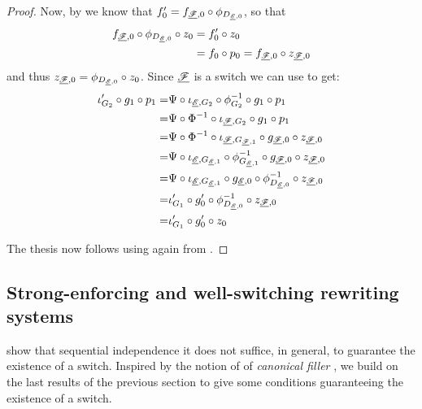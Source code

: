\begin{proof}
 	Now, by  we know that $f'_{0}=f_{\underline{\mathscr{F}},0}\circ \phi_{D_{\underline{\mathscr{E}},0}}$, so that 
 	\begin{align*}
 		f_{\underline{\mathscr{F}},0}\circ \phi_{D_{\underline{\mathscr{E}},0}}\circ z_0&=f'_{0}\circ z_0\\&=f_0\circ p_0=f_{\underline{\mathscr{F}},0}\circ z_{\underline{\mathscr{F}},0}
 	\end{align*}
 	and thus $z_{\underline{\mathscr{F}},0}=\phi_{D_{\underline{\mathscr{E}},0}}\circ z_0$. Since $\underline{\mathscr{F}}$ is a switch we can use  to get:
	\begin{align*}
		\iota'_{G_2}\circ g_1\circ p_1=&\Psi\circ \iota_{\underline{\mathscr{E}}, G_2}\circ \phi^{-1}_{G_2}\circ g_1\circ p_1\\=&\Psi\circ \Phi^{-1}\circ \iota_{\underline{\mathscr{F}}, G_2}\circ g_1\circ p_1\\=&\Psi \circ \Phi^{-1}\circ \iota_{\underline{\mathscr{F}}, G_{\underline{\mathscr{F}}, 1}}\circ g_{\underline{\mathscr{F}}, 0}\circ z_{\underline{\mathscr{F}},0}\\=&\Psi \circ \iota_{\underline{\mathscr{E}}, G_{\underline{\mathscr{E}}, 1}}\circ \phi^{-1}_{G_{\underline{\mathscr{E}}, 1}}\circ g_{\underline{\mathscr{F}}, 0}\circ z_{\underline{\mathscr{F}},0}\\=&\Psi \circ \iota_{\underline{\mathscr{E}}, G_{\underline{\mathscr{E}}, 1}}\circ g_{\underline{\mathscr{E}},0}\circ \phi^{-1}_{D_{\underline{\mathscr{E}}, 0}}\circ  z_{\underline{\mathscr{F}},0}\\=&\iota'_{G_1}\circ g'_{0} \circ \phi^{-1}_{D_{\underline{\mathscr{E}}, 0}} \circ z_{\underline{\mathscr{F}},0}\\=&	\iota'_{G_1}\circ g'_{0} \circ z_{0}\end{align*}
	
	The thesis now follows using again from .
	\end{proof}


\subsection{Strong-enforcing and well-switching rewriting systems}

 show that sequential independence it does not suffice, in general, to guarantee the existence of a switch.  Inspired by the notion of of \emph{canonical filler}
\cite{heindel2009category}, we build on the last results of the previous section to give some conditions guaranteeing the existence of a switch. 

